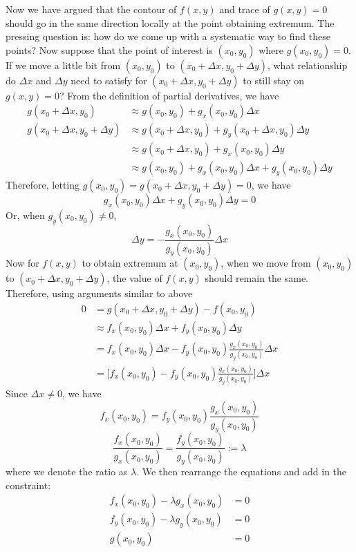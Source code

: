 Now we have argued that the contour of $f(x,y)$ and trace of $g(x,y) = 0$ should go in the same direction locally at the point obtaining extremum.  The pressing question is: how do we come up with a systematic way to find these points?  Now suppose that the point of interest is $(x_0, y_0)$ where $g(x_0, y_0)=0$.  If we move a little bit from $(x_0, y_0)$ to $(x_0 + \Delta x, y_0 + \Delta y)$, what relationship do $\Delta x$ and $\Delta y$ need to satisfy for $(x_0 + \Delta x, y_0 + \Delta y)$ to still stay on $g(x,y) = 0$?  From the definition of partial derivatives, we have
\begin{align*}
    g(x_0 + \Delta x, y_0) &\approx g(x_0,y_0) + g_x(x_0, y_0) \Delta x\\
    g(x_0 + \Delta x, y_0 + \Delta y) &\approx g(x_0 + \Delta x,y_0) + g_y(x_0+\Delta x, y_0) \Delta y\\
    &\approx g(x_0 + \Delta x,y_0) + g_x(x_0, y_0) \Delta y\\
    &\approx g(x_0,y_0) + g_x(x_0, y_0) \Delta x + g_y(x_0, y_0) \Delta y
\end{align*}
Therefore, letting $g(x_0, y_0) = g(x_0 + \Delta x, y_0 + \Delta y) = 0$, we have
\[g_x(x_0, y_0) \Delta x + g_y(x_0, y_0) \Delta y = 0\]
Or, when $g_y(x_0,y_0) \ne 0$,
\[\Delta y = -\frac{g_x(x_0, y_0)}{g_y(x_0, y_0)} \Delta x\]
Now for $f(x,y)$ to obtain extremum at $(x_0, y_0)$, when we move from $(x_0, y_0)$ to $(x_0 + \Delta x, y_0 + \Delta y)$, the value of $f(x,y)$ should remain the same.  Therefore, using arguments similar to above
\begin{align*}
    0 &= g(x_0 + \Delta x, y_0 + \Delta y) - f(x_0,y_0)\\
    &\approx f_x(x_0, y_0) \Delta x + f_y(x_0, y_0) \Delta y\\
    &= f_x(x_0, y_0) \Delta x - f_y(x_0, y_0)\frac{g_x(x_0, y_0)}{g_y(x_0, y_0)} \Delta x\\
    &= \Big[f_x(x_0, y_0) - f_y(x_0, y_0)\frac{g_x(x_0, y_0)}{g_y(x_0, y_0)}\Big] \Delta x
\end{align*}
Since $\Delta x \ne 0$, we have
\[f_x(x_0,y_0) = f_y(x_0, y_0)\frac{g_x(x_0, y_0)}{g_y(x_0, y_0)}\]
\[\frac{f_x(x_0,y_0)}{g_x(x_0,y_0)} = \frac{f_y(x_0, y_0)}{g_y(x_0, y_0)} := \lambda\]
where we denote the ratio as $\lambda$.  We then rearrange the equations and add in the constraint:
\begin{align*}
    f_x(x_0,y_0) - \lambda g_x(x_0,y_0) &= 0\\
    f_y(x_0,y_0) - \lambda g_y(x_0,y_0) &= 0\\
    g(x_0, y_0) &= 0
\end{align*}
